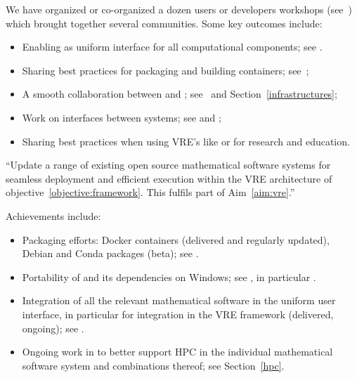 \begin{compactenum}
  We have organized or co-organized a dozen users or developers
  workshops (see~) which brought
  together several communities. Some key outcomes include:
  \begin{itemize}
  \item Enabling \Jupyter as uniform interface for all computational
    components; see .
  \item Sharing best practices for packaging and building
    containers;
    see~;
  \item A smooth collaboration between \JupyterHub and \SMC;
    see~ and
    Section~\ref{infrastructures};
  \item Work on interfaces between systems; see
     and
    ;
  \item Sharing best practices when using VRE's like \cocalc or \Jupyter
    for research and education.
  \end{itemize}

\item \label{objective:updates} ``Update a range of existing open source
  mathematical software systems for seamless deployment and efficient
  execution within the VRE architecture of objective~\ref{objective:framework}.
  This fulfils part of Aim~\ref{aim:vre}.''

  Achievements include:
  \begin{itemize}
  \item Packaging efforts: Docker containers (delivered and
    regularly updated), Debian and Conda packages (beta); see
    .
  \item Portability of \Sage and its dependencies on Windows; see
    , in particular
    .
  \item Integration of all the relevant mathematical software in the
    uniform \Jupyter user interface, in particular for integration in
    the VRE framework (delivered, ongoing); see
    .
  \item Ongoing work in  to better support HPC in the
    individual mathematical software system and combinations thereof;
    see Section~\ref{hpc}.
  \end{itemize}


\end{compactenum}
